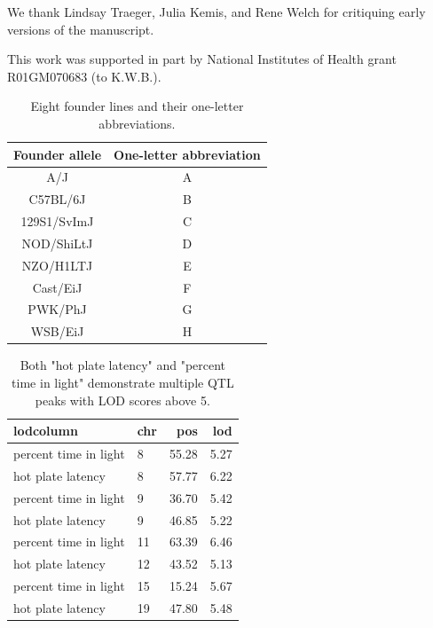 \documentclass[12pt,twoside, lineno]{gsajnl}
\begin{document}
We thank Lindsay Traeger, Julia Kemis, and Rene Welch for critiquing
early versions of the manuscript.

This work was supported in part by National Institutes of Health grant
R01GM070683 (to K.W.B.). 

\newpage
\appendix

\renewcommand{\thetable}{\textbf{S\arabic{table}}}
\setcounter{table}{0}


\begin{table}[hb]
  \caption{Eight founder lines and their one-letter abbreviations.}
  \label{table-letters}
\begin{center}
\small
  \begin{tabular}{ c | c }
    \hline
    Founder allele & One-letter abbreviation \\ \hline
    A/J & A \\
    C57BL/6J & B \\
    129S1/SvImJ & C \\
    NOD/ShiLtJ & D\\
    NZO/H1LTJ & E\\
    Cast/EiJ & F\\
    PWK/PhJ & G\\
    WSB/EiJ & H\\
    \hline
  \end{tabular}

\end{center}
  \end{table}

\clearpage

\begin{table}[hb]
\caption{Both "hot plate latency" and "percent time in light"
  demonstrate multiple QTL peaks with LOD scores above 5.}
  \label{table-peaks}
\begin{center}
\begin{tabular}{l|lrr}
  \hline
lodcolumn & chr & pos & lod \\
   \hline
percent time in light & 8 & 55.28 & 5.27 \\
 hot plate latency & 8 & 57.77 & 6.22 \\
 percent time in light & 9 & 36.70 & 5.42 \\
 hot plate latency & 9 & 46.85 & 5.22 \\
 percent time in light & 11 & 63.39 & 6.46 \\
 hot plate latency & 12 & 43.52 & 5.13 \\
 percent time in light & 15 & 15.24 & 5.67 \\
 hot plate latency & 19 & 47.80 & 5.48 \\
   \hline
\end{tabular}
\end{center}
\end{table}
\end{document}
